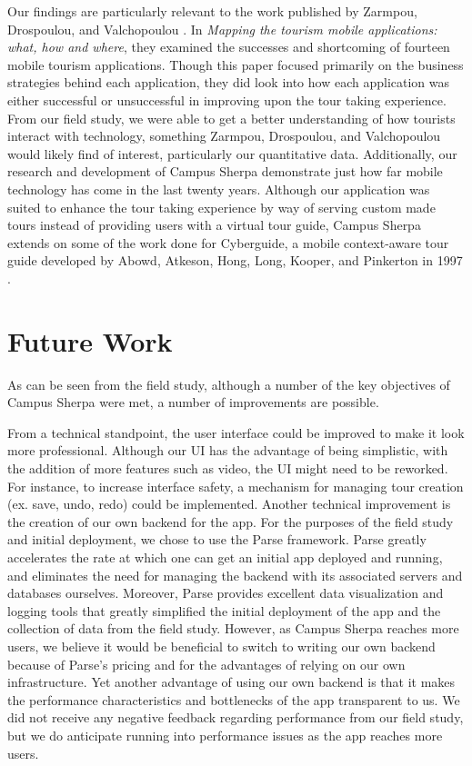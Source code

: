 \documentclass{sigchi}
\begin{document}
Our findings are particularly relevant to the work published by Zarmpou, Drospoulou, and Valchopoulou  \cite{Zarmpou:2013:MTM:2490257.2490295}. In \emph{Mapping the tourism mobile applications: what, how and where}, they examined the successes and shortcoming of fourteen mobile tourism applications. Though this paper focused primarily on the business strategies behind each application, they did look into how each application was either successful or unsuccessful in improving upon the tour taking experience. From our field study, we were able to get a better understanding of how tourists interact with technology, something Zarmpou, Drospoulou, and Valchopoulou would likely find of interest, particularly our quantitative data. Additionally, our research and development of Campus Sherpa demonstrate just how far mobile technology has come in the last twenty years. Although our application was suited to enhance the tour taking experience by way of serving custom made tours instead of providing users with a virtual tour guide, Campus Sherpa extends on some of the work done for Cyberguide, a mobile context-aware tour guide developed by Abowd, Atkeson, Hong, Long, Kooper, and Pinkerton in 1997 \cite{Abowd:1997:CMC:272186.272199}.

\section{Future Work}

As can be seen from the field study, although a number of the key objectives of Campus Sherpa were met, a number of improvements are possible. 

From a technical standpoint, the user interface could be improved to make it look more professional. Although our UI has the advantage of being simplistic, with the addition of more features such as video, the UI might need to be reworked. For instance, to increase interface safety, a mechanism for managing tour creation (ex. save, undo, redo) could be implemented. Another technical improvement is the creation of our own backend for the app. For the purposes of the field study and initial deployment, we chose to use the Parse framework. Parse greatly accelerates the rate at which one can get an initial app deployed and running, and eliminates the need for managing the backend with its associated servers and databases ourselves. Moreover, Parse provides excellent data visualization and logging tools that greatly simplified the initial deployment of the app and the collection of data from the field study. However, as Campus Sherpa reaches more users, we believe it would be beneficial to switch to writing our own backend because of Parse's pricing and for the advantages of relying on our own infrastructure. Yet another advantage of using our own backend is that it makes the performance characteristics and bottlenecks of the app transparent to us. We did not receive any negative feedback regarding performance from our field study, but we do anticipate running into performance issues as the app reaches more users. 
\end{document}
